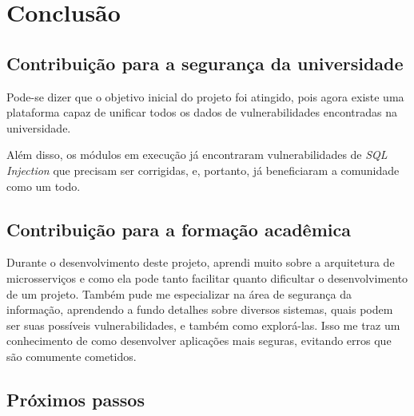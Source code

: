 \chapter{Conclusão}
\label{cap:conclusao}

\section{Contribuição para a segurança da universidade}

Pode-se dizer que o objetivo inicial do projeto foi atingido, pois agora existe uma plataforma capaz de unificar todos os dados de vulnerabilidades encontradas na universidade.

Além disso, os módulos em execução já encontraram vulnerabilidades de \textit{SQL Injection} que precisam ser corrigidas, e, portanto, já beneficiaram a comunidade como um todo.


\section{Contribuição para a formação acadêmica}

Durante o desenvolvimento deste projeto, aprendi muito sobre a arquitetura de microsserviços e como ela pode tanto facilitar quanto dificultar o desenvolvimento de um projeto. 
Também pude me especializar na área de segurança da informação, aprendendo a fundo detalhes sobre diversos sistemas, quais podem ser suas possíveis vulnerabilidades, e também como explorá-las. Isso me traz um conhecimento de como desenvolver aplicações mais seguras, evitando erros que são comumente cometidos.





\section{Próximos passos}


